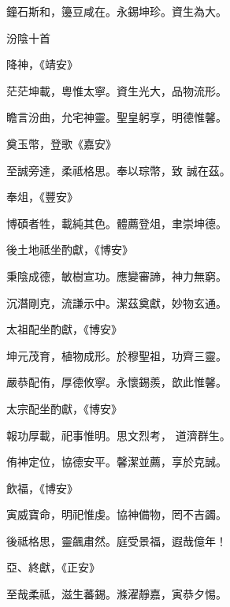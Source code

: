 \begin{pinyinscope}
 鐘石斯和，籩豆咸在。永錫坤珍。資生為大。



 汾陰十首



 降神，《靖安》



 茫茫坤載，粵惟太寧。資生光大，品物流形。



 瞻言汾曲，允宅神靈。聖皇躬享，明德惟馨。



 奠玉幣，登歌《嘉安》



 至誠旁達，柔祗格思。奉以琮幣，致
 誠在茲。



 奉俎，《豐安》



 博碩者牲，載純其色。體薦登俎，聿崇坤德。



 後土地祗坐酌獻，《博安》



 秉陰成德，敏樹宣功。應變審諦，神力無窮。



 沉潛剛克，流謙示中。潔茲奠獻，妙物玄通。



 太祖配坐酌獻，《博安》



 坤元茂育，植物成形。於穆聖祖，功齊三靈。



 嚴恭配侑，厚德攸寧。永懷錫羨，歆此惟馨。



 太宗配坐酌獻，《博安》



 報功厚載，祀事惟明。思文烈考，
 道濟群生。



 侑神定位，協德安平。馨潔並薦，享於克誠。



 飲福，《博安》



 寅威寶命，明祀惟虔。協神備物，罔不吉蠲。



 後祗格思，靈飆肅然。庭受景福，遐哉億年！



 亞、終獻，《正安》



 至哉柔祗，滋生蕃錫。滌濯靜嘉，寅恭夕惕。




\end{pinyinscope}
